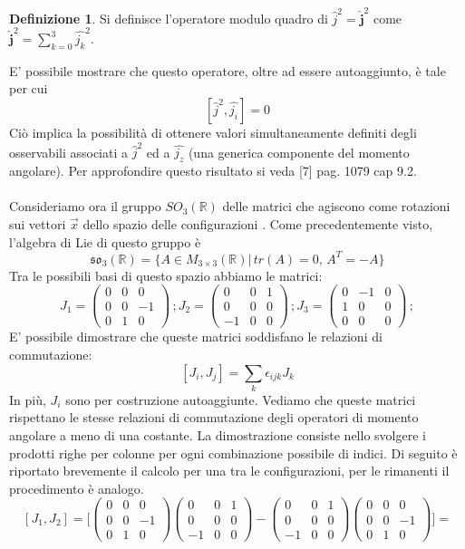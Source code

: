 \documentclass[12pt,a4paper]{report}
\theoremstyle{definition}
\newtheorem{Def}{Definizione}[chapter]
\theoremstyle{Theorem}
\theoremstyle{definition}
\theoremstyle{definition}
\theoremstyle{definition}
\begin{document}
\begin{Def}
	Si definisce l'operatore modulo quadro di $\hat{j}^2=\hat{\textbf{j}}^2$ come $\hat{\textbf{j}}^2=\sum_{k=0}^{3}\hat{j_k}^2$.
\end{Def}
E' possibile mostrare che questo operatore, oltre ad essere autoaggiunto, è tale per cui
$$[\hat{j}^2,\hat{j_i}]=0$$
Ciò implica la possibilità di ottenere valori simultaneamente definiti degli osservabili associati a $\hat{j}^2$ ed a $\hat{j_z}$ (una generica componente del momento angolare).
Per approfondire questo risultato si veda [7] pag. 1079 cap 9.2.\\
\\
Consideriamo ora il gruppo $SO_3(\mathbb{R})$ delle matrici che agiscono come rotazioni sui vettori  $\vec{x}$ dello spazio delle configurazioni . Come precedentemente visto, l'algebra di Lie di questo gruppo è
$$\mathfrak{so_3}(\mathbb{R})=\{A\in M_{3\times 3}(\mathbb{R})|\, tr(A)=0,\, A^T=-A\}$$
Tra le possibili basi di questo spazio abbiamo le matrici:$$
J_1=
\begin{pmatrix}
	0 &0&0\\
	0 &0&-1\\
	0 &1&0
\end{pmatrix} \, ;
J_2=
\begin{pmatrix}
	0 &0&1\\
	0 &0&0\\
	-1 &0&0
\end{pmatrix} \, ;
J_3=
\begin{pmatrix}
	0 &-1&0\\
	1 &0&0\\
	0 &0&0
\end{pmatrix} \, ;
$$
E' possibile dimostrare che queste matrici soddisfano le relazioni di commutazione:
$$[J_i,J_j]=\sum_{k}\epsilon_{ijk}J_k$$
In più, $J_i$ sono per costruzione autoaggiunte.
Vediamo che queste matrici rispettano le stesse relazioni di commutazione degli operatori di momento angolare a meno di una costante.
La dimostrazione consiste nello svolgere i prodotti righe per colonne per ogni combinazione possibile di indici. Di seguito è riportato brevemente il calcolo per una tra le configurazioni, per le rimanenti il procedimento è analogo.
$$[J_1,J_2]=\bigg[
\begin{pmatrix}
	0 &0&0\\
	0 &0&-1\\
	0 &1&0
\end{pmatrix}
\begin{pmatrix}
	0 &0&1\\
	0 &0&0\\
	-1 &0&0
\end{pmatrix}
-
\begin{pmatrix}
	0 &0&1\\
	0 &0&0\\
	-1 &0&0
\end{pmatrix}
\begin{pmatrix}
	0 &0&0\\
	0 &0&-1\\
	0 &1&0
\end{pmatrix}
\bigg]=$$
\end{document}
